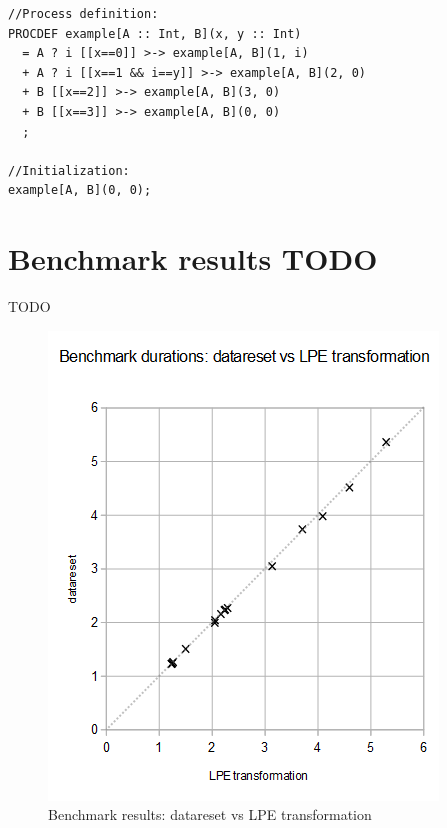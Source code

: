 \begin{lstlisting}
//Process definition:
PROCDEF example[A :: Int, B](x, y :: Int)
  = A ? i [[x==0]] >-> example[A, B](1, i)
  + A ? i [[x==1 && i==y]] >-> example[A, B](2, 0)
  + B [[x==2]] >-> example[A, B](3, 0)
  + B [[x==3]] >-> example[A, B](0, 0)
  ;

//Initialization:
example[A, B](0, 0);
\end{lstlisting}

\section{Benchmark results TODO}

TODO

\begin{figure}[!ht]
\begin{center}
\includegraphics[width=0.7\linewidth]{charts/datareset-vs-lpe-only}
\caption{Benchmark results: datareset vs LPE transformation}
\label{datareset-vs-lpe-only:fig}
\end{center}
\end{figure}

